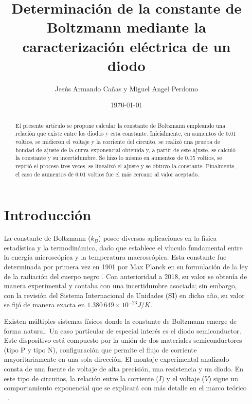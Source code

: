 \documentclass[twocolumn]{article} %
\begin{document}
\title{Determinación de la constante de Boltzmann mediante la caracterización eléctrica de un diodo}
\author{Jesús Armando Cañas y Miguel Angel Perdomo}
\date{\today}


\maketitle

\begin{abstract}
   El presente artículo se propone calcular la constante de Boltzmann empleando una relación que existe entre los diodos y esta constante. Inicialmente, en aumentos de 0.01 voltios, se midieron el voltaje y la corriente del circuito, se realizó una prueba de bondad de ajuste de la curva exponencial obtenida y, a partir de este ajuste, se calculó la constante y su incertidumbre. Se hizo lo mismo en aumentos de 0.05 voltios, se repitió el proceso tres veces, se linealizó el ajuste y se obtuvo la constante. Finalmente, el caso de aumentos de 0.01 voltios fue el más cercano al valor aceptado.
\end{abstract}

\vspace{2cm} 

\section{Introducción}
\vspace{-0.3cm}
La constante de Boltzmann ($k_B$) posee diversas aplicaciones en la física estadística y la termodinámica, dado que establece el vínculo fundamental entre la energía microscópica y la temperatura macroscópica. Esta constante fue determinada por primera vez en 1901 por Max Planck en su formulación de la ley de la radiación del cuerpo negro \cite{Planck1901}. Con anterioridad a 2018, su valor se obtenía de manera experimental y contaba con una incertidumbre asociada; sin embargo, con la revisión del Sistema Internacional de Unidades (SI) en dicho año, su valor se fijó de manera exacta en $1.380\,649\times 10^{-23} J/K$\cite{Stock2019}.

Existen múltiples sistemas físicos donde la constante de Boltzmann emerge de forma natural. Un caso particular de especial interés es el diodo semiconductor. Este dispositivo está compuesto por la unión de dos materiales semiconductores (tipo P y tipo N), configuración que permite el flujo de corriente mayoritariamente en una sola dirección. El montaje experimental analizado consta de una fuente de voltaje de alta precisión, una resistencia y un diodo. En este tipo de circuitos, la relación entre la corriente ($I$) y el voltaje ($V$) sigue un comportamiento exponencial que se explicará con más detalle en el marco teórico ~\cite{leon2014}.
\end{document}
